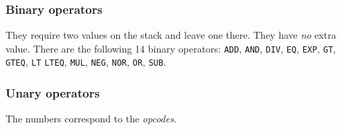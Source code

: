 \documentclass[11pt]{article}
\begin{document}
\subsubsection{Binary operators}
\label{sec:orgf1a1b73}


They require two values on the stack and leave one there. They have \emph{no}
extra value. There are the following 14 binary operators: \texttt{ADD}, \texttt{AND},
\texttt{DIV}, \texttt{EQ}, \texttt{EXP}, \texttt{GT}, \texttt{GTEQ}, \texttt{LT} \texttt{LTEQ}, \texttt{MUL}, \texttt{NEG}, \texttt{NOR}, \texttt{OR},
\texttt{SUB}.

\subsubsection{Unary operators}
\label{sec:orgc7100af}




The numbers correspond to the \emph{opcodes}.    
\end{document}
